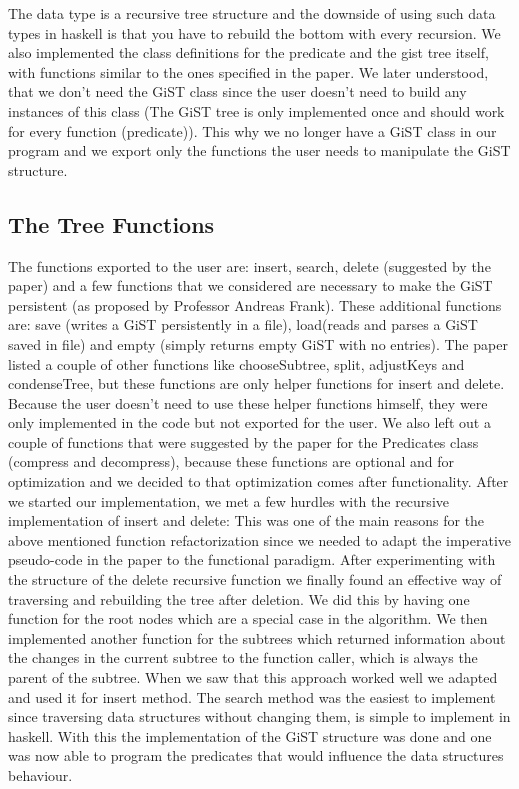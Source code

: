 \documentclass{scrartcl}
\begin{document}
 The data type is a recursive tree structure and the downside of using such data types in haskell is that you have to rebuild the bottom with every recursion.
 We also implemented the class definitions for the predicate and the gist tree itself, with functions similar to the ones specified in the paper. 
 We later understood, that we don't need the GiST class since the user doesn't need to build any instances of this class (The GiST tree is only implemented once and should work
 for every function (predicate)). This why we no longer have a GiST class in our program and we export only the functions the user needs to manipulate the GiST structure.
\subsection{The Tree Functions}
The functions exported to the user are: insert, search, delete (suggested by the paper) and a few functions that we considered are necessary to make the GiST persistent (as proposed by Professor Andreas Frank).
These additional functions are: save (writes a GiST persistently in a file), load(reads and parses a GiST saved in file) and empty (simply returns empty GiST with no entries).
The paper \cite{Hellerstein95generalizedsearch} listed a couple of other functions like chooseSubtree, split, adjustKeys and condenseTree, but these functions are only helper functions for insert and delete.
Because the user doesn't need to use these helper functions himself, they were only implemented in the code but not exported for the user. 
We also left out a couple of functions that were suggested by the paper for the Predicates class (compress and decompress), because these functions are optional and for optimization and
we decided to that optimization comes after functionality.
After we started our implementation, we met a few hurdles with the recursive implementation of insert and delete: This was one of the main reasons for the above mentioned function refactorization since we needed
to adapt the imperative pseudo-code in the paper to the functional paradigm. 
After experimenting with the structure of the delete recursive function we finally found an effective way of traversing and rebuilding the tree after deletion. We did this
by having one function for the root nodes which are a special case in the algorithm.
We then implemented another function for the subtrees which returned information about the changes in the current subtree to the function caller, which is always the parent
of the subtree. When we saw that this approach worked well we adapted and used it for insert method. The search method was the easiest to implement since traversing data structures without changing 
them, is simple to implement in haskell. With this the implementation of the GiST structure was done and one was now able to program the predicates that would influence the data structures behaviour.
\end{document}
